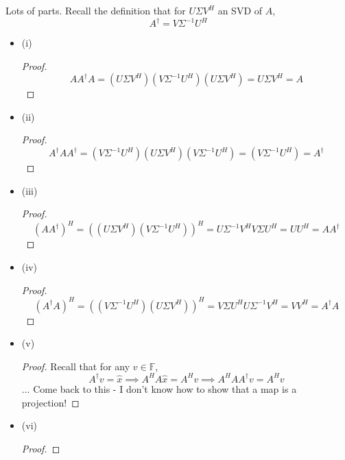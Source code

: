 \documentclass[12pt]{article}
\newenvironment{problem}[2][Problem]{\begin{trivlist}
\item[\hskip \labelsep {\bfseries #1}\hskip \labelsep {\bfseries #2.}]}{\end{trivlist}}
\theoremstyle{definition}
\theoremstyle{definition}
\theoremstyle{definition}
\theoremstyle{definition}
\begin{document}
\begin{problem}{4.38}
Lots of parts. Recall the definition that for $U \Sigma V^H$ an SVD of $A$, $$A^\dagger = V \Sigma^{-1} U^H$$
\begin{itemize}
\item (i) \begin{proof}
$$
AA^\dagger A = (U \Sigma V^H) (V \Sigma^{-1} U^H) (U \Sigma V^H) = U \Sigma V^H = A
$$
\end{proof}
\item (ii) \begin{proof}
$$A^\dagger A A^\dagger = (V \Sigma^{-1} U^H)(U \Sigma V^H) (V \Sigma^{-1} U^H) = (V \Sigma^{-1} U^H) = A^\dagger $$
\end{proof}
\item (iii) \begin{proof}
$$
(AA^\dagger)^H = ((U \Sigma V^H) (V \Sigma^{-1} U^H))^H = U \Sigma^{-1}V^H V \Sigma U^H = UU^H = AA^\dagger
$$
\end{proof}
\item (iv) \begin{proof}
$$
(A^\dagger A)^H = ((V \Sigma^{-1} U^H) (U \Sigma V^H))^H = V \Sigma U^H U \Sigma^{-1} V^H = VV^H = A^\dagger A
$$
\end{proof}
\item (v) \begin{proof}
Recall that for any $v \in \mathbb{F}$,
$$A^\dagger v = \hat{x} \implies A^HA \hat{x} = A^H v \implies A^HAA^\dagger v = A^H v  $$
... Come back to this - I don't know how to show that a map is a projection!
\end{proof}
\item (vi) \begin{proof}

\end{proof}
\end{itemize}
\end{problem}
\end{document}
